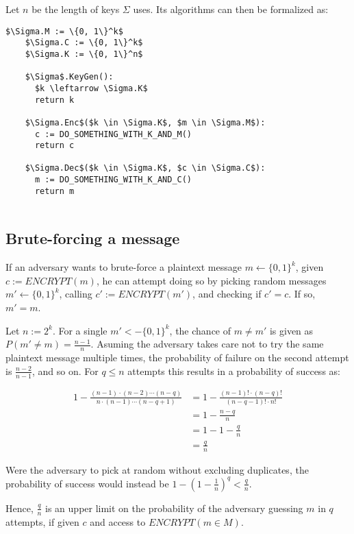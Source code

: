 \documentclass[a4paper]{scrreprt}
\begin{document}
 Let $n$ be the length of keys $\Sigma$ uses. Its algorithms can then be
 formalized as:

\begin{lstlisting}[mathescape=true, frame=single]
	$\Sigma.M := \{0, 1\}^k$
	$\Sigma.C := \{0, 1\}^k$
	$\Sigma.K := \{0, 1\}^n$

	$\Sigma$.KeyGen():
	  $k \leftarrow \Sigma.K$
	  return k

	$\Sigma.Enc$($k \in \Sigma.K$, $m \in \Sigma.M$):
	  c := DO_SOMETHING_WITH_K_AND_M()
	  return c

	$\Sigma.Dec$($k \in \Sigma.K$, $c \in \Sigma.C$):
	  m := DO_SOMETHING_WITH_K_AND_C()
	  return m
	
\end{lstlisting}


\subsection{Brute-forcing a message}

If an adversary wants to brute-force a plaintext message $m \leftarrow \{0,
1\}^k$, given $c := ENCRYPT(m)$, he can attempt doing so by picking random
messages $m' \leftarrow \{0, 1\}^k$, calling $c' := ENCRYPT(m')$, and checking
if $c' = c$. If so, $m' = m$.

Let $n := 2^k$. For a single $m' <- \{0, 1\}^k$, the chance of $m \neq m'$ is
given as  $P(m' \neq m) = \frac{n-1}{n}$. Asuming the adversary takes care not
to try the same plaintext message multiple times, the probability of failure on
the second attempt is $\frac{n - 2}{n - 1}$, and so on. For $q \leq n$ attempts
this results in a probability of success as:

\begin{align*}
	1 - \frac{(n - 1) \cdot (n - 2) \cdots (n - q)}{n \cdot (n-1) \cdots (n - q + 1)} 
	  & = 1 - \frac{(n-1)! \cdot (n - q)!}{(n - q - 1)! \cdot n!} \\
	  & = 1 - \frac{n - q}{n} \\
	  & = 1 - 1 - \frac{q}{n} \\
	  & = \frac{q}{n}
\end{align*}

Were the adversary to pick at random without excluding duplicates, the
probability of success would instead be $1 - (1 - \frac{1}{n})^q <
\frac{q}{n}$.

Hence, $\frac{q}{n}$ is an upper limit on the probability of the adversary
guessing $m$ in $q$ attempts, if given $c$ and access to $ENCRYPT(m \in M)$.
\end{document}

